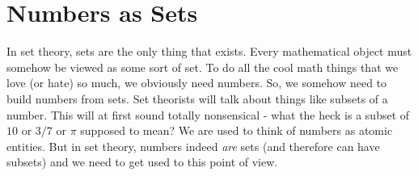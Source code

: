 











\section{Numbers as Sets}
In set theory, sets are the only thing that exists. Every mathematical object must somehow be viewed as some sort of set. To do all the cool math things that we love (or hate) so much, we obviously need numbers. So, we somehow need to build numbers from sets. Set theorists will talk about things like subsets of a number. This will at first sound totally nonsensical - what the heck is a subset of $10$ or $3/7$ or $\pi$ supposed to mean? We are used to think of numbers as atomic entities. But in set theory, numbers indeed \emph{are} sets (and therefore can have subsets) and we need to get used to this point of view.

% 




